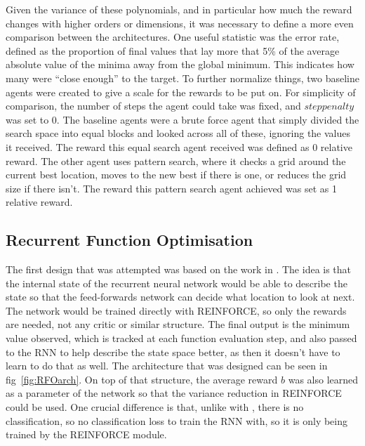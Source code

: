 Given the variance of these polynomials, and in particular how much the reward changes with higher orders or dimensions, it was necessary to define a more even comparison between the architectures. One useful statistic was the error rate, defined as the proportion of final values that lay more that 5\% of the average absolute value of the minima away from the global minimum. This indicates how many were ``close enough'' to the target. To further normalize things, two baseline agents were created to give a scale for the rewards to be put on. For simplicity of comparison, the number of steps the agent could take was fixed, and $steppenalty$ was set to 0. The baseline agents were a brute force agent that simply divided the search space into equal blocks and looked across all of these, ignoring the values it received. The reward this equal search agent received was defined as 0 relative reward. The other agent uses pattern search, where it checks a grid around the current best location, moves to the new best if there is one, or reduces the grid size if there isn't. The reward this pattern search agent achieved was set as 1 relative reward.

\subsection{Recurrent Function Optimisation}
The first design that was attempted was based on the work in \cite{RVA}. The idea is that the internal state of the recurrent neural network would be able to describe the state so that the feed-forwards network can decide what location to look at next. The network would be trained directly with REINFORCE, so only the rewards are needed, not any critic or similar structure. The final output is the minimum value observed, which is tracked at each function evaluation step, and also passed to the RNN to help describe the state space better, as then it doesn't have to learn to do that as well. The architecture that was designed can be seen in fig~\ref{fig:RFOarch}. On top of that structure, the average reward $b$ was also learned as a parameter of the network so that the variance reduction in REINFORCE could be used. One crucial difference is that, unlike with \cite{RVA}, there is no classification, so no classification loss to train the RNN with, so it is only being trained by the REINFORCE module.

